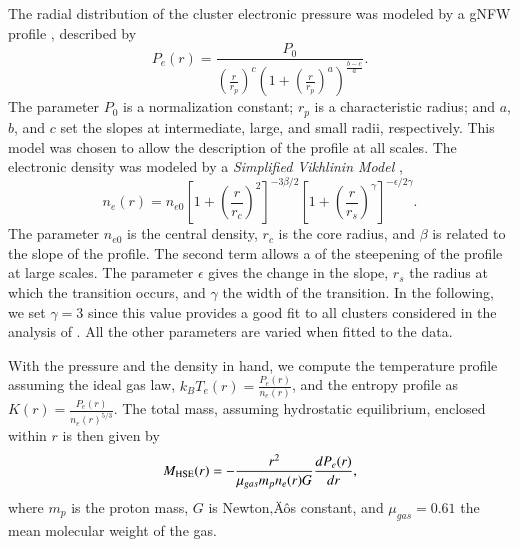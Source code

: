 \documentclass[traditabstract]{aa}
\begin{document}
The radial distribution of the cluster electronic pressure was modeled by a gNFW profile \citep{nagai2007}, described by
\begin{equation}
        P_e(r) = \frac{P_0}{\left(\frac{r}{r_p}\right)^c \left(1+\left(\frac{r}{r_p}\right)^a\right)^{\frac{b-c}{a}}}.
\label{eq:gNFW}
\end{equation}
The parameter $P_0$ is a normalization constant; $r_p$ is a characteristic radius; and $a$, $b$, and $c$ set the slopes at intermediate, large, and small radii, respectively. This model was chosen to allow the description of the profile at all scales. The electronic density was modeled by a \emph{Simplified Vikhlinin Model} \citep{vikhlinin2006},
\begin{equation}
        n_e(r) = n_{e0} \left[1+\left(\frac{r}{r_c}\right)^2 \right]^{-3 \beta /2} \left[ 1+\left(\frac{r}{r_s}\right)^{\gamma} \right]^{-\epsilon/2 \gamma}.
\label{eq:SVM}
\end{equation}
The parameter $n_{e0}$ is the central density, $r_c$ is the core radius, and $\beta$ is related to the slope of the profile. The second term allows a of the steepening of the profile at large scales. The parameter $\epsilon$ gives the change in the slope, $r_s$ the radius at which the transition occurs, and $\gamma$ the width of the transition. In the following, we set $\gamma = 3$ since this value provides a good fit to all clusters considered in the analysis of \cite{vikhlinin2006}. All the other parameters are varied when fitted to the data.

With the pressure and the density in hand, we compute the temperature profile assuming the ideal gas law, $k_B T_e(r) = \frac{P_e(r)}{n_e(r)}$, and the entropy profile as $K(r) =  \frac{P_e(r)}{n_e(r)^{5/3}}$. The total mass, assuming hydrostatic equilibrium, enclosed within $r$ is then given by 
\begin{equation}
M_{\rm HSE}(r) = -\frac{r^2}{\mu_{gas} m_p n_e(r) G} \frac{dP_e(r)}{dr}
,\end{equation}
where $m_p$ is the proton mass, $G$ is Newton‚Äôs constant, and $\mu_{gas} = 0.61$ the mean molecular weight of the gas.
\end{document}
